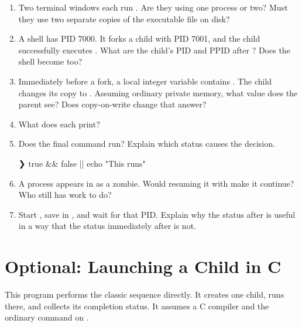 \documentclass[11pt]{article}
\begin{document}
\begin{enumerate}
\item Two terminal windows each run .
Are they using one process or two?
Must they use two separate copies of the executable file on disk?

\item A shell has PID 7000.
It forks a child with PID 7001, and the child successfully executes .
What are the child's PID and PPID after ?
Does the shell become  too?

\item Immediately before a fork, a local integer variable contains .
The child changes its copy to .
Assuming ordinary private memory, what value does the parent see?
Does copy-on-write change that answer?

\item What does each  print?

\item Does the final command run?
Explain which status causes the decision.
\begin{terminal}[unbreakable]
❯ true && false || echo "This runs"
\end{terminal}

\item A process appears in  as a zombie.
Would resuming it with  make it continue?
Who still has work to do?

\item Start , save \inlinesh{$!} in , and wait for that PID.
Explain why the status after  is useful in a way that the status immediately after \inlinesh{&} is not.
\end{enumerate}

\clearpage
\appendix
\section{Optional: Launching a Child in C}

This program performs the classic sequence directly.
It creates one child, runs  there, and collects its completion status.
It assumes a C compiler and the ordinary  command on .
\end{document}

